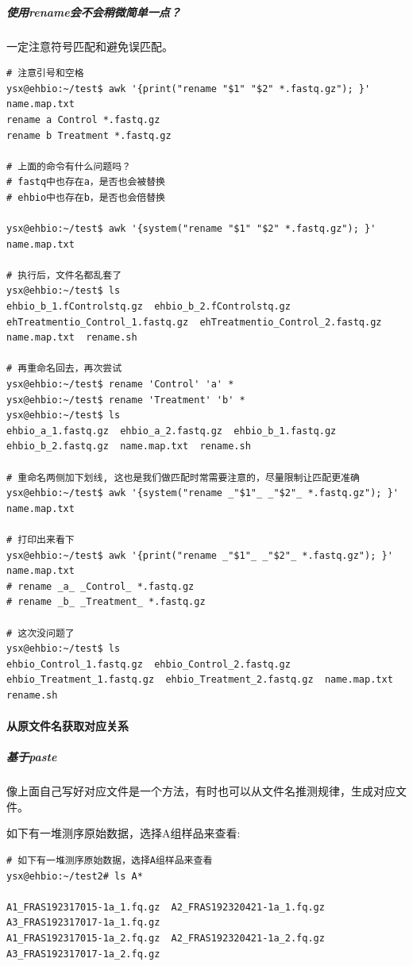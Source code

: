 \documentclass[]{article}
\numberwithin{figure}{section}
\numberwithin{table}{section}
\begin{document}
\hypertarget{rename_for_complex_style}{%
\subparagraph{使用rename会不会稍微简单一点？}\label{rename_for_complex_style}}

一定注意符号匹配和避免误匹配。

\begin{verbatim}
# 注意引号和空格
ysx@ehbio:~/test$ awk '{print("rename "$1" "$2" *.fastq.gz"); }' name.map.txt
rename a Control *.fastq.gz
rename b Treatment *.fastq.gz

# 上面的命令有什么问题吗？
# fastq中也存在a，是否也会被替换
# ehbio中也存在b，是否也会倍替换

ysx@ehbio:~/test$ awk '{system("rename "$1" "$2" *.fastq.gz"); }' name.map.txt

# 执行后，文件名都乱套了
ysx@ehbio:~/test$ ls
ehbio_b_1.fControlstq.gz  ehbio_b_2.fControlstq.gz  ehTreatmentio_Control_1.fastq.gz  ehTreatmentio_Control_2.fastq.gz  name.map.txt  rename.sh

# 再重命名回去，再次尝试
ysx@ehbio:~/test$ rename 'Control' 'a' *
ysx@ehbio:~/test$ rename 'Treatment' 'b' *
ysx@ehbio:~/test$ ls
ehbio_a_1.fastq.gz  ehbio_a_2.fastq.gz  ehbio_b_1.fastq.gz  ehbio_b_2.fastq.gz  name.map.txt  rename.sh

# 重命名两侧加下划线, 这也是我们做匹配时常需要注意的，尽量限制让匹配更准确
ysx@ehbio:~/test$ awk '{system("rename _"$1"_ _"$2"_ *.fastq.gz"); }' name.map.txt

# 打印出来看下
ysx@ehbio:~/test$ awk '{print("rename _"$1"_ _"$2"_ *.fastq.gz"); }' name.map.txt
# rename _a_ _Control_ *.fastq.gz
# rename _b_ _Treatment_ *.fastq.gz

# 这次没问题了
ysx@ehbio:~/test$ ls
ehbio_Control_1.fastq.gz  ehbio_Control_2.fastq.gz  ehbio_Treatment_1.fastq.gz  ehbio_Treatment_2.fastq.gz  name.map.txt  rename.sh
\end{verbatim}

\hypertarget{rename_relation_from_old_name}{%
\paragraph{从原文件名获取对应关系}\label{rename_relation_from_old_name}}

\hypertarget{rename_paste}{%
\subparagraph{基于paste}\label{rename_paste}}

像上面自己写好对应文件是一个方法，有时也可以从文件名推测规律，生成对应文件。

如下有一堆测序原始数据，选择A组样品来查看:

\begin{verbatim}
# 如下有一堆测序原始数据，选择A组样品来查看
ysx@ehbio:~/test2# ls A*

A1_FRAS192317015-1a_1.fq.gz  A2_FRAS192320421-1a_1.fq.gz  A3_FRAS192317017-1a_1.fq.gz
A1_FRAS192317015-1a_2.fq.gz  A2_FRAS192320421-1a_2.fq.gz  A3_FRAS192317017-1a_2.fq.gz
\end{verbatim}
\end{document}
